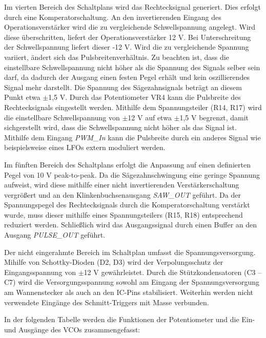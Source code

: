 Im vierten Bereich des Schaltplans wird das Rechtecksignal generiert. 
Dies erfolgt durch eine Komperatorschaltung.
An den invertierenden Eingang des Operationsverstärker wird die zu vergleichende Schwellspannung angelegt. 
Wird diese überschritten, liefert der Operationsverstärker 12 V. 
Bei Unterschreitung der Schwellspannung liefert dieser -12 V.
Wird die zu vergleichende Spannung variiert, ändert sich das Pulsbreitenverhältnis.
Zu beachten ist, dass die einstellbare Schwellspannung nicht höher als die Spannung des Signals selber sein darf, da dadurch der Ausgang einen festen Pegel erhält und kein oszillierendes Signal mehr darstellt.
Die Spannung des Sägezahnsignals beträgt an diesem Punkt etwa $\pm$1,5 V.
Durch das Potentiometer VR4 kann die Pulsbreite des Rechtecksignals eingestellt werden.
Mithilfe dem Spannungsteiler (R14, R17) wird die einstellbare Schwellspannung von $\pm$12 V auf etwa $\pm$1,5 V begrenzt, damit sichgerstellt wird, dass die Schwellspannung nicht höher als das Signal ist.
Mithilfe dem Eingang \textit{PWM\_In} kann die Pulsbreite durch ein anderes Signal wie beispielsweise eines LFOs extern moduliert werden.

Im fünften Bereich des Schaltplans erfolgt die Anpassung auf einen definierten Pegel von 10 V peak-to-peak. 
Da die Sägezahnschwingung eine geringe Spannung aufweist, wird diese mithilfe einer nicht invertierenden Verstärkerschaltung vergrößert und an den Klinkenbuchsenausgang \textit{SAW\_OUT} geführt. 
Da der Spannungspegel des Rechtecksignals durch die Komperatorschaltung verstärkt wurde, muss dieser mithilfe eines Spannungsteilers (R15, R18) entsprechend reduziert werden. 
Schließlich wird das Ausgangssignal durch einen Buffer an den Ausgang \textit{PULSE\_OUT} geführt.

Der nicht eingerahmte Bereich im Schaltplan umfasst die Spannungsversorgung. 
Mihilfe von Schottky-Dioden (D2, D3) wird der Verpolungsschutz der Eingangsspannung von $\pm$12 V gewährleistet. 
Durch die Stützkondensatoren (C3 -- C7) wird die Versorgungsspannung sowohl am Eingang der Spannungsversorgung am Wannenstecker als auch an den IC-Pins stabilisiert.
Weiterhin werden nicht verwendete Eingänge des Schmitt-Triggers mit Masse verbunden.

In der folgenden Tabelle werden die Funktionen der Potentiometer und die Ein- und Ausgänge des VCOs zusammengefasst:


